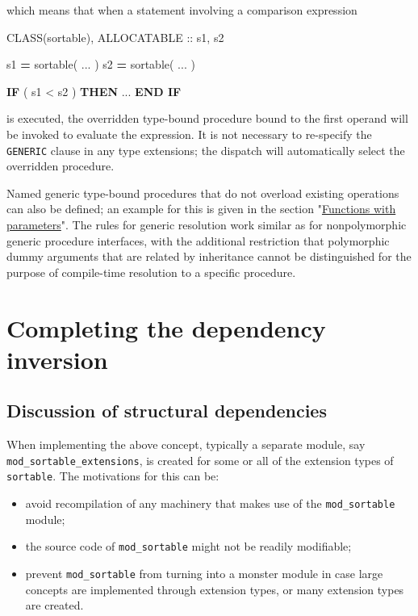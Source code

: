 \documentclass[
]{scrartcl}
\newenvironment{Shaded}{}{}
\newcommand{\DataTypeTok}[1]{\textcolor[rgb]{0.56,0.13,0.00}{#1}}
\newcommand{\KeywordTok}[1]{\textcolor[rgb]{0.00,0.44,0.13}{\textbf{#1}}}
\newcommand{\NormalTok}[1]{#1}
\newcommand{\OperatorTok}[1]{\textcolor[rgb]{0.40,0.40,0.40}{#1}}
\providecommand{\tightlist}{%
  \setlength{\itemsep}{0pt}\setlength{\parskip}{0pt}}
\begin{document}
which means that when a statement involving a comparison expression

\begin{Shaded}
\begin{Highlighting}[]
\DataTypeTok{CLASS(sortable)}\NormalTok{, }\DataTypeTok{ALLOCATABLE} \DataTypeTok{::}\NormalTok{ s1, s2}

\NormalTok{s1 }\KeywordTok{=}\NormalTok{ sortable( ... )}
\NormalTok{s2 }\KeywordTok{=}\NormalTok{ sortable( ... )}

\KeywordTok{IF}\NormalTok{ ( s1 }\OperatorTok{\textless{}}\NormalTok{ s2 ) }\KeywordTok{THEN}
\NormalTok{   ...}
\KeywordTok{END IF}
\end{Highlighting}
\end{Shaded}

is executed, the overridden type-bound procedure bound to the first
operand will be invoked to evaluate the expression. It is not necessary
to re-specify the \texttt{GENERIC} clause in any type extensions; the
dispatch will automatically select the overridden procedure.

Named generic type-bound procedures that do not overload existing
operations can also be defined; an example for this is given in the
section
"\href{User:RBaSc/draft_ftnoo\#Functions_with_parameters}{Functions with
parameters}". The rules for generic resolution work similar as for
nonpolymorphic generic procedure interfaces, with the additional
restriction that polymorphic dummy arguments that are related by
inheritance cannot be distinguished for the purpose of compile-time
resolution to a specific procedure.

\section{Completing the dependency
inversion}\label{completing-the-dependency-inversion}

\subsection{Discussion of structural
dependencies}\label{discussion-of-structural-dependencies}

When implementing the above concept, typically a separate module, say
\texttt{mod\_sortable\_extensions}, is created for some or all of the
extension types of \texttt{sortable}. The motivations for this can be:

\begin{itemize}
\tightlist
\item
  avoid recompilation of any machinery that makes use of the
  \texttt{mod\_sortable} module;
\item
  the source code of \texttt{mod\_sortable} might not be readily
  modifiable;
\item
  prevent \texttt{mod\_sortable} from turning into a monster module in
  case large concepts are implemented through extension types, or many
  extension types are created.
\end{itemize}
\end{document}
